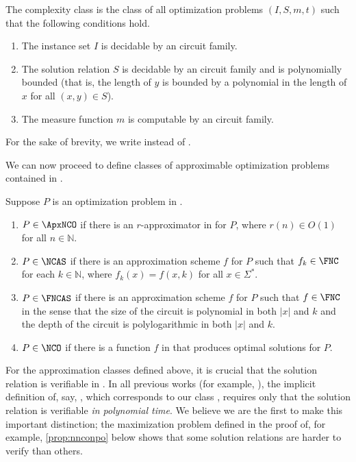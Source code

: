 \documentclass[]{article}
\begin{document}
\begin{definition}\label{def:nnco}
  The complexity class \NNCOpoly{} is the class of all optimization problems $(I, S, m, t)$ such that the following conditions hold.
  \begin{enumerate}
  \item The instance set $I$ is decidable by an \NC{} circuit family.
  \item The solution relation $S$ is decidable by an \NC{} circuit family and is polynomially bounded (that is, the length of $y$ is bounded by a polynomial in the length of $x$ for all $(x, y)\in S$).
  \item The measure function $m$ is computable by an \FNC{} circuit family.
  \end{enumerate}
  For the sake of brevity, we write \NNCO{} instead of \NNCOpoly{}.
\end{definition}

We can now proceed to define classes of approximable optimization problems contained in \NNCO.

\begin{definition}\label{def:ncx}
  Suppose $P$ is an optimization problem in \NNCO.
  \begin{enumerate}
  \item $P \in \ApxNCO$ if there is an $r$-approximator in \FNC{} for $P$, where $r(n) \in O(1)$ for all $n \in \mathbb{N}$.
  \item $P \in \NCAS$ if there is an approximation scheme $f$ for $P$ such that $f_k \in \FNC$ for each $k \in \mathbb{N}$, where $f_k(x) = f(x, k)$ for all $x \in \Sigma^*$.
  \item $P \in \FNCAS$ if there is an approximation scheme $f$ for $P$ such that $f \in \FNC$ in the sense that the size of the circuit is polynomial in both $|x|$ and $k$ and the depth of the circuit is polylogarithmic in both $|x|$ and $k$.
  \item $P \in \NCO$ if there is a function $f$ in \FNC{} that produces optimal solutions for $P$.
  \end{enumerate}
\end{definition}

For the \NC{} approximation classes defined above, it is crucial that the solution relation is verifiable in \NC{}.
In all previous works (for example, \cite{dsst97, sx95}), the implicit definition of, say, \NCX{}, which corresponds to our class \ApxNCO, requires only that the solution relation is verifiable \emph{in polynomial time}.
We believe we are the first to make this important distinction; the maximization problem defined in the proof of, for example, \autoref{prop:nnconpo} below shows that some solution relations are harder to verify than others.
\end{document}
